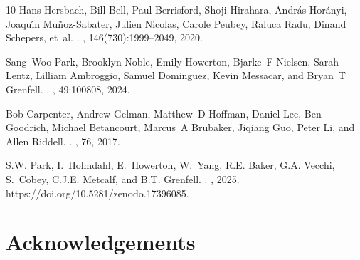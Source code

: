 \documentclass[12pt]{article}
\begin{document}
\begin{thebibliography}{10}
Hans Hersbach, Bill Bell, Paul Berrisford, Shoji Hirahara, Andr{\'a}s Hor{\'a}nyi, Joaqu{\'\i}n Mu{\~n}oz-Sabater, Julien Nicolas, Carole Peubey, Raluca Radu, Dinand Schepers, et~al.
.
, 146(730):1999--2049, 2020.

Sang~Woo Park, Brooklyn Noble, Emily Howerton, Bjarke~F Nielsen, Sarah Lentz, Lilliam Ambroggio, Samuel Dominguez, Kevin Messacar, and Bryan~T Grenfell.
.
, 49:100808, 2024.

Bob Carpenter, Andrew Gelman, Matthew~D Hoffman, Daniel Lee, Ben Goodrich, Michael Betancourt, Marcus~A Brubaker, Jiqiang Guo, Peter Li, and Allen Riddell.
.
, 76, 2017.

S.W. Park, I.~Holmdahl, E.~Howerton, W.~Yang, R.E. Baker, G.A. Vecchi, S.~Cobey, C.J.E. Metcalf, and B.T. Grenfell.
.
, 2025.
\newblock https://doi.org/10.5281/zenodo.17396085.

\end{thebibliography}

\pagebreak

\section*{Acknowledgements}
\end{document}

